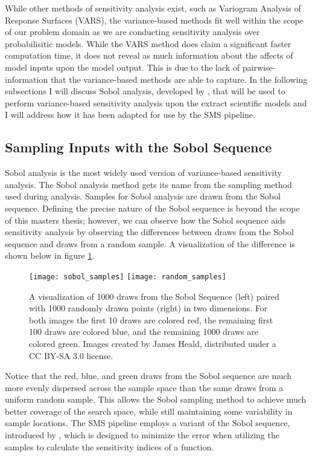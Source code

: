 While other methods of sensitivity analysis exist, such as Variogram Analysis of Response Surfaces (VARS), the variance-based methods fit well within the scope of our problem domain as we are conducting sensitivity analysis over probabilisitic models.
While the VARS method does claim a significant faster computation time, it does not reveal as much information about the affects of model inputs upon the model output.
This is due to the lack of pairwise-information that the variance-based methods are able to capture.
In the following subsections I will discuss Sobol analysis, developed by \citet{sobol2001globalSA}, that will be used to perform variance-based sensitivity analysis upon the extract scientific models and I will address how it has been adapted for use by the SMS pipeline.

\subsection{Sampling Inputs with the Sobol Sequence\label{sec:sobol_seq}}
Sobol analysis is the most widely used version of variance-based sensitivity analysis. The Sobol analysis method gets its name from the sampling method used during analysis. Samples for Sobol analysis are drawn from the Sobol sequence. Defining the precise nature of the Sobol sequence is beyond the scope of this masters thesis; however, we can observe how the Sobol sequence aids sensitivity analysis by observing the differences between draws from the Sobol sequence and draws from a random sample. A visualization of the difference is shown below in figure \ref{sobol_seq_vis}.

\FloatBarrier
\begin{figure}[!htbp]
    \label{sobol_seq_vis}
    \centering
    \texttt{[image: sobol\_samples]}\hfill
    \texttt{[image: random\_samples]}
    \caption[Sobol Sequence Visualization]{A visualization of 1000 draws from the Sobol Sequence (left) paired with 1000 randomly drawn points (right) in two dimensions. For both images the first 10 draws are colored red, the remaining first 100 draws are colored blue, and the remaining 1000 draws are colored green. Images created by James Heald, distributed under a CC BY-SA 3.0 license.}
\end{figure}
\FloatBarrier

Notice that the red, blue, and green draws from the Sobol sequence are much more evenly dispersed across the sample space than the same draws from a uniform random sample. This allows the Sobol sampling method to achieve much better coverage of the search space, while still maintaining some variability in sample locations. The SMS pipeline employs a variant of the Sobol sequence, introduced by \citet{saltelli2002ImprovedSobolSeq}, which is designed to minimize the error when utilizing the samples to calculate the sensitivity indices of a function.

